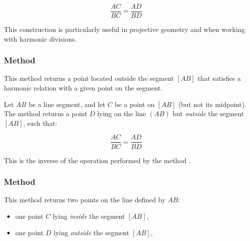 \[
\frac{AC}{BC} = \frac{AD}{BD}
\]


This construction is particularly useful in projective geometry and when working with harmonic divisions.

\vspace{2em}
\begin{tkzexample}
\begin{center}
\end{center}

\end{tkzexample}

\subsubsection{Method }
\label{ssub:method_line_harmonic_ext}
This method returns a point located outside the segment $[AB]$ that satisfies a harmonic relation with a given point on the segment.

\medskip

Let $AB$ be a line segment, and let $C$ be a point on $[AB]$ (but not its midpoint). The method returns a point $D$ lying on the line $(AB)$ but \emph{outside} the segment $[AB]$, such that:

\[
\frac{AC}{BC} = \frac{AD}{BD}
\]


This is the inverse of the operation performed by the method .

\subsubsection{Method }
\label{ssub:harmonic_both}

This method returns two points on the line defined by $AB$:

\begin{itemize}
  \item one point $C$ lying \emph{inside} the segment $[AB]$,
  \item one point $D$ lying \emph{outside} the segment $[AB]$,
\end{itemize}

